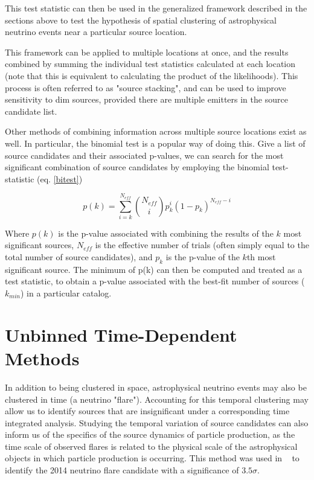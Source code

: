 This test statistic can then be used in the generalized framework described in the sections above to test the hypothesis of spatial clustering of astrophysical neutrino events near a particular source location. 

This framework can be applied to multiple locations at once, and the results combined by summing the individual test statistics calculated at each location (note that this is equivalent to calculating the product of the likelihoods). This process is often referred to as "source stacking", and can be used to improve sensitivity to dim sources, provided there are multiple emitters in the source candidate list. 

Other methods of combining information across multiple source locations exist as well. In particular, the binomial test is a popular way of doing this. Give a list of source candidates and their associated p-values, we can search for the most significant combination of source candidates by employing the binomial test-statistic (eq. \ref{bitest})

\begin{equation}
    p(k) = \sum_{i=k}^{N_{eff}} \binom{N_{eff}}{i}p_k^i(1-p_k)^{N_{eff}-i}
    \label{bitest}
\end{equation}

Where $p(k)$ is the p-value associated with combining the results of the $k$ most significant sources, $N_{eff}$ is the effective number of trials (often simply equal to the total number of source candidates), and $p_k$ is the p-value of the $k$th most significant source. The minimum of p(k) can then be computed and treated as a test statistic, to obtain a p-value associated with the best-fit number of sources ($k_{min}$) in a particular catalog. 


\section{Unbinned Time-Dependent Methods}
In addition to being clustered in space, astrophysical neutrino events may also be clustered in time (a neutrino "flare"). Accounting for this temporal clustering may allow us to identify sources that are insignificant under a corresponding time integrated analysis. Studying the temporal variation of source candidates can also inform us of the specifics of the source dynamics of particle production, as the time scale of observed flares is related to the physical scale of the astrophysical objects in which particle production is occurring. This method was used in ~\cite{txs_archival} to identify the 2014 neutrino flare candidate with a significance of $3.5 \sigma$. 

